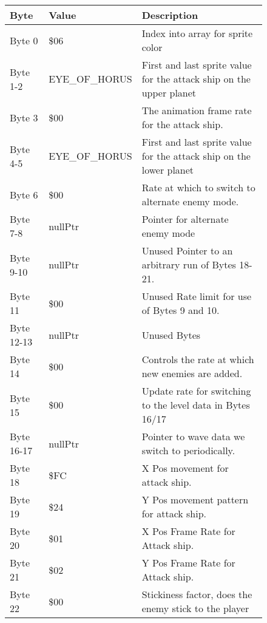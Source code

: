 \begin{figure}[H]
{\begin{adjustbox}{width=12cm}
\begin{tabular}{lll}
\toprule
 Byte       & Value              & Description                                                         \\
\midrule
 Byte 0     & \$06                & Index into array for sprite color                                   \\
 Byte 1-2   & EYE\_OF\_HORUS       & First and last sprite value for the attack ship on the upper planet \\
 Byte 3     & \$00                & The animation frame rate for the attack ship.                       \\
 Byte 4-5   & EYE\_OF\_HORUS       & First and last sprite value for the attack ship on the lower planet \\
 Byte 6     & \$00                & Rate at which to switch to alternate enemy mode.                    \\
 Byte 7-8   & nullPtr            & Pointer for alternate enemy mode                                    \\
 Byte 9-10  & nullPtr            & Unused Pointer to an arbitrary run of Bytes 18-21.                  \\
 Byte 11    & \$00                & Unused Rate limit for use of Bytes 9 and 10.                        \\
 Byte 12-13 & nullPtr            & Unused Bytes                                                        \\
 Byte 14    & \$00                & Controls the rate at which new enemies are added.                   \\
 Byte 15    & \$00                & Update rate for switching to the level data in Bytes 16/17          \\
 Byte 16-17 & nullPtr            & Pointer to wave data we switch to periodically.                     \\
 Byte 18    & \$FC                & X Pos movement for attack ship.                                     \\
 Byte 19    & \$24                & Y Pos movement pattern for attack ship.                             \\
 Byte 20    & \$01                & X Pos Frame Rate for Attack ship.                                   \\
 Byte 21    & \$02                & Y Pos Frame Rate for Attack ship.                                   \\
 Byte 22    & \$00                & Stickiness factor, does the enemy stick to the player               \\

\end{tabular}
\end{adjustbox}}
\end{figure}
